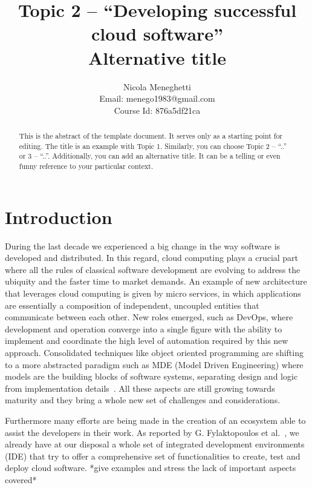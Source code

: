 \documentclass[a4paper, 10pt, conference]{ieeeconf}
\title{Topic 2 -- ``Developing successful cloud software'' \\
\large{Alternative title}} %
\author{Nicola Meneghetti \\
	Email: menego1983@gmail.com \\
	Course Id: 876a5df21ca
}
\begin{document}
\maketitle
\thispagestyle{empty}
\pagestyle{empty}

\begin{abstract}

This is the abstract of the template document. It serves only as a starting point for editing. The title is an example with Topic 1. Similarly, you can choose Topic 2 -- ``..'' or 3 -- ``..''. Additionally, you can add an alternative title. It can be a telling or even funny reference to your particular context.

\end{abstract}

\section{Introduction}

During the last decade we experienced a big change in the way software is developed and distributed. In this regard, cloud computing plays a crucial part where all the rules of classical software development are evolving to address the ubiquity and the faster time to market demands. An example of new architecture that leverages cloud computing is given by micro services, in which applications are essentially a composition of independent, uncoupled entities that communicate between each other. New roles emerged, such as DevOps, where development and operation converge into a single figure with the ability to implement and coordinate the high level of automation required by this new approach. Consolidated techniques like object oriented programming are shifting to a more abstracted paradigm such as MDE (Model Driven Engineering) where models are the building blocks of software systems, separating design and logic from implementation details~\cite{overview-platforms, fuggetta2014software}. All these aspects are still growing towards maturity and they bring a whole new set of challenges and considerations.

Furthermore many efforts are being made in the creation of an ecosystem able to assist the developers in their work. As reported by G. Fylaktopoulos et al.~\cite{overview-platforms}, we already have at our disposal a whole set of integrated development environments (IDE) that try to offer a comprehensive set of functionalities to create, test and deploy cloud software. *give examples and stress the lack of important aspects covered*
\end{document}
